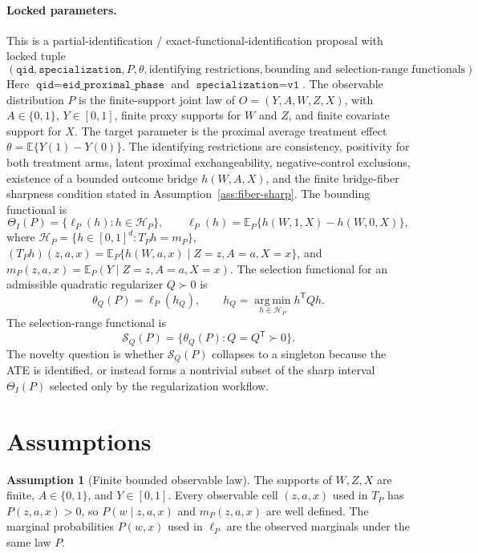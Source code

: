 \documentclass[11pt]{article}
\newcommand{\E}{\mathbb{E}}
\newcommand{\transpose}{\mathsf{T}}
\newcommand{\calH}{\mathcal{H}}
\theoremstyle{definition}
\newtheorem{assumption}{Assumption}
\theoremstyle{plain}
\theoremstyle{remark}
\begin{document}
\paragraph{Locked parameters.}
This is a partial-identification / exact-functional-identification proposal
with locked tuple
\[
(\texttt{qid},\texttt{specialization}, P, \theta, \text{identifying restrictions},
\text{bounding and selection-range functionals}).
\]
Here \(\texttt{qid}=\texttt{eid\_proximal\_phase}\) and
\(\texttt{specialization}=\texttt{v1}\).  The observable distribution \(P\)
is the finite-support joint law of \(O=(Y,A,W,Z,X)\), with
\(A\in\{0,1\}\), \(Y\in[0,1]\), finite proxy supports for \(W\) and \(Z\),
and finite covariate support for \(X\).  The target parameter is the proximal
average treatment effect \(\theta=\E\{Y(1)-Y(0)\}\).  The identifying
restrictions are consistency, positivity for both treatment arms, latent
proximal exchangeability, negative-control exclusions, existence of a bounded
outcome bridge \(h(W,A,X)\), and the finite bridge-fiber sharpness condition
stated in Assumption~\ref{ass:fiber-sharp}.  The bounding functional is
\[
\Theta_I(P)=\{\ell_P(h):h\in\calH_P\},\qquad
\ell_P(h)=\E_P\{h(W,1,X)-h(W,0,X)\},
\]
where \(\calH_P=\{h\in[0,1]^d:T_Ph=m_P\}\),
\((T_Ph)(z,a,x)=\E_P\{h(W,a,x)\mid Z=z,A=a,X=x\}\), and
\(m_P(z,a,x)=\E_P(Y\mid Z=z,A=a,X=x)\).  The selection functional for an
admissible quadratic regularizer \(Q\succ0\) is
\[
\theta_Q(P)=\ell_P(h_Q),\qquad
h_Q=\operatorname*{arg\,min}_{h\in\calH_P} h^\transpose Qh.
\]
The selection-range functional is
\[
\mathcal S_Q(P)=\{\theta_Q(P):Q=Q^\transpose\succ0\}.
\]
The novelty question is whether \(\mathcal S_Q(P)\) collapses to a singleton
because the ATE is identified, or instead forms a nontrivial subset of the
sharp interval \(\Theta_I(P)\) selected only by the regularization workflow.

\section{Assumptions}
\begin{assumption}[Finite bounded observable law]\label{ass:finite-bounded}
The supports of \(W,Z,X\) are finite, \(A\in\{0,1\}\), and \(Y\in[0,1]\).
Every observable cell \((z,a,x)\) used in \(T_P\) has \(P(z,a,x)>0\), so
\(P(w\mid z,a,x)\) and \(m_P(z,a,x)\) are well defined.  The marginal
probabilities \(P(w,x)\) used in \(\ell_P\) are the observed marginals under
the same law \(P\).
\end{assumption}
\end{document}
